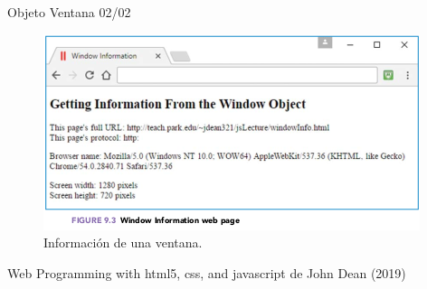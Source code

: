 \begin{frame}{Objeto Ventana 02/02}
\justifying
\begin{figure}[H]
\centering
\includegraphics[scale=0.5]{Section_Files/images/Sec02/02.png}
\caption{Información de una ventana.}
\end{figure}


{\tiny Web Programming with html5, css, and javascript de John Dean (2019)}
\end{frame}